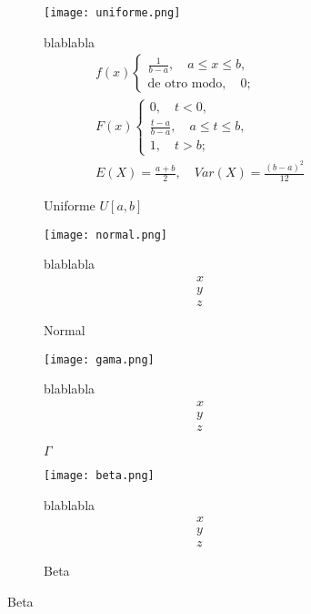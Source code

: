 \begin{figure}[H]
	\begin{subfigure}[t]{.5\textwidth}
		\texttt{[image: uniforme.png]}\caption{Uniforme $U[a,b]$}
		blablabla
		\begin{equation}
		\begin{matrix}
		f(x)\begin{cases}\frac{1}{b-a},\quad a\leq x\leq b,\\\text{de otro modo},\quad 0;\end{cases}\\
		F(x)\begin{cases}0,\quad t<0,\\\frac{t-a}{b-a},\quad a\leq t\leq b,\\1,\quad t>b;\end{cases}\\
		E(X)=\frac{a+b}{2},\quad Var(X)=\frac{{(b-a)}^2}{12}
		\end{matrix}
		\end{equation}
	\end{subfigure}\qquad
\begin{subfigure}[t]{.5\textwidth}
	\texttt{[image: normal.png]}\caption{Normal}
	blablabla
	\begin{equation}
	\begin{matrix}
	x\\
	y\\
	z
	\end{matrix}
	\end{equation}
\end{subfigure}

	\begin{subfigure}[t]{.5\textwidth}
		\texttt{[image: gama.png]}\caption{$\Gamma$}
		blablabla
		\begin{equation}
		\begin{matrix}
		x\\
		y\\
		z
		\end{matrix}
		\end{equation}
	\end{subfigure}

\begin{subfigure}[t]{.5\textwidth}
		\texttt{[image: beta.png]}\caption{Beta}
		blablabla
		\begin{equation}
		\begin{matrix}
		x\\
		y\\
		z
		\end{matrix}
		\end{equation}
	\end{subfigure}


\end{figure}
